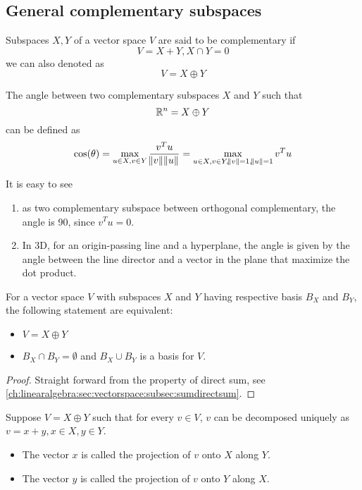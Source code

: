 \begin{refsection}
\subsection{General complementary subspaces}
\begin{definition}
	\cite[392]{meyer2000matrix}Subspaces $X,Y$ of a vector space $V$ are said to be complementary if
	$$V = X + Y, X\cap Y = 0$$
	we can also denoted as
	$$V = X \oplus Y$$
\end{definition}

\begin{definition}\cite[389]{meyer2000matrix}
	The angle between two complementary subspaces $X$ and $Y$ such that $$\mathbb{R}^n = X\oplus Y$$ can be defined as
	$$\cos(\theta) = \max_{u\in X,v\in Y} \frac{v^Tu}{\norm{v}\norm{u}} = \max_{u\in X,v\in Y,\norm{v}=1,\norm{u}=1} v^Tu$$
\end{definition}

\begin{remark}
	It is easy to see 
	\begin{enumerate}
		\item as two complementary subspace between orthogonal complementary, the angle is 90, since $v^Tu = 0$.
		\item In 3D, for an origin-passing line and a hyperplane, the angle is given by the angle between the line director and a vector in the plane that maximize the dot product.
	\end{enumerate}
\end{remark}



\begin{theorem}\cite[383]{meyer2000matrix}
	For a vector space $V$ with subspaces $X$ and $Y$ having respective basis $B_X$ and $B_Y$, the following statement are equivalent:
	\begin{itemize}
		\item $V = X\oplus Y$
		\item $B_X\cap B_Y = \emptyset$ and $B_X\cup B_Y$ is a basis for $V$.
	\end{itemize}
\end{theorem}
\begin{proof}
	Straight forward from the property of direct sum, see \autoref{ch:linearalgebra:sec:vectorspace:subsec:sumdirectsum}.
\end{proof}


\begin{definition}
Suppose $V=X\oplus Y$ such that for every $v\in V$, $v$ can be decomposed uniquely as $v=x+y,x\in X,y\in Y$.
	\begin{itemize}
		\item The vector $x$ is called the projection of $v$ onto $X$ along $Y$.
		\item The vector $y$ is called the projection of $v$ onto $Y$ along $X$.
	\end{itemize}
\end{definition}


\end{refsection}
